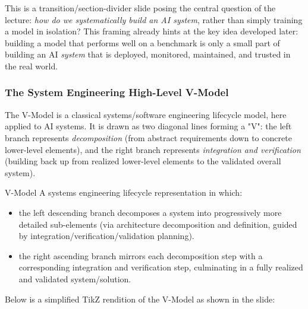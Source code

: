This is a transition/section-divider slide posing the central question of the lecture: \emph{how do we systematically build an AI system}, rather than simply training a model in isolation? This framing already hints at the key idea developed later: building a model that performs well on a benchmark is only a small part of building an AI \emph{system} that is deployed, monitored, maintained, and trusted in the real world.

\subsubsection{ The System Engineering High-Level V-Model}

The V-Model is a classical systems/software engineering lifecycle model, here applied to AI systems. It is drawn as two diagonal lines forming a "V": the left branch represents \emph{decomposition} (from abstract requirements down to concrete lower-level elements), and the right branch represents \emph{integration and verification} (building back up from realized lower-level elements to the validated overall system).

\begin{defbox}{V-Model}
A systems engineering lifecycle representation in which:
\begin{itemize}
    \item  the left descending branch decomposes a system into progressively more detailed sub-elements (via architecture decomposition and definition, guided by integration/verification/validation planning).
    \item the right ascending branch mirrors each decomposition step with a corresponding integration and verification step, culminating in a fully realized and validated system/solution.
\end{itemize}
\end{defbox}



Below is a simplified TikZ rendition of the V-Model as shown in the slide:


